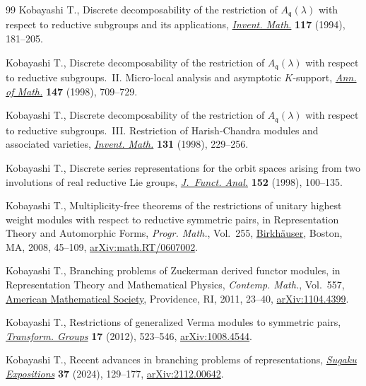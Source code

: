 \documentclass[10pt,a4paper]{amsart}
\numberwithin{equation}{section}
\theoremstyle{definition}
\begin{document}
\begin{thebibliography}{99}
Kobayashi T., Discrete decomposability of the restriction of
 {$A_{\mathfrak{q}}(\lambda)$} with respect to reductive subgroups and its
 applications, \href{https://doi.org/10.1007/BF01232239}{\textit{Invent.
 Math.}} \textbf{117} (1994), 181--205.

Kobayashi T., Discrete decomposability of the restriction of
 {$A_{\mathfrak{q}}(\lambda)$} with respect to reductive subgroups.~{II}.
 {M}icro-local analysis and asymptotic {$K$}-support,
 \href{https://doi.org/10.2307/120963}{\textit{Ann. of Math.}} \textbf{147}
 (1998), 709--729.

Kobayashi T., Discrete decomposability of the restriction of
 {$A_{\mathfrak{q}}(\lambda)$} with respect to reductive subgroups.~{III}.
 {R}estriction of {H}arish-{C}handra modules and associated varieties,
 \href{https://doi.org/10.1007/s002220050203}{\textit{Invent. Math.}}
 \textbf{131} (1998), 229--256.

Kobayashi T., Discrete series representations for the orbit spaces arising from
 two involutions of real reductive {L}ie groups,
 \href{https://doi.org/10.1006/jfan.1997.3128}{\textit{J.~Funct. Anal.}}
 \textbf{152} (1998), 100--135.

Kobayashi T., Multiplicity-free theorems of the restrictions of unitary highest
 weight modules with respect to reductive symmetric pairs, in Representation
 Theory and Automorphic Forms, \textit{Progr. Math.}, Vol.~255,
 \href{https://doi.org/10.1007/978-0-8176-4646-2_3}{Birkh\"auser},
 Boston, MA, 2008, 45--109,
 \href{http://arxiv.org/abs/math.RT/0607002}{arXiv:math.RT/0607002}.

Kobayashi T., Branching problems of {Z}uckerman derived functor modules, in
 Representation Theory and Mathematical Physics, \textit{Contemp. Math.}, Vol.~557, \href{https://doi.org/10.1090/conm/557/11024}{American Mathematical
 Society}, Providence, RI, 2011, 23--40,
 \href{http://arxiv.org/abs/1104.4399}{arXiv:1104.4399}.

Kobayashi T., Restrictions of generalized {V}erma modules to symmetric pairs,
 \href{https://doi.org/10.1007/s00031-012-9180-y}{\textit{Transform. Groups}}
 \textbf{17} (2012), 523--546,
 \href{http://arxiv.org/abs/1008.4544}{arXiv:1008.4544}.

Kobayashi T., Recent advances in branching problems of representations,
 \href{https://doi.org/10.1090/suga/485}{\textit{Sugaku Expositions}}
 \textbf{37} (2024), 129--177,
 \href{http://arxiv.org/abs/2112.00642}{arXiv:2112.00642}.


\end{thebibliography}
\end{document}
